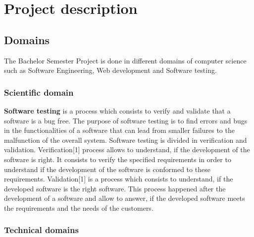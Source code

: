 \documentclass[conference,compsoc]{IEEEtran}
\begin{document}
\section{Project description}
\subsection{Domains}
The Bachelor Semester Project is done in different domains of computer science such as Software Engineering, Web development and Software testing. 

\subsubsection{Scientific domain}

\textbf{Software testing} is a process which consists to verify and validate that a software is a bug free. The purpose of software testing is to find errors and bugs in the functionalities of a software that can lead from smaller failures to the malfunction of the overall system. Software testing is divided in verification and validation.     
\newline                                                                                                                       
Verification[1] process allows to understand, if the development of the software is right. It consists to verify the specified requirements in order to understand if the development of the software is conformed to these requirements.      
\newline                                                                                                                     
Validation[1] is a process which consists to understand, if the developed software is the right software. This process happened after the development of a software and allow to answer, if the developed software meets the requirements and the needs of the customers. 
                                              
\subsubsection{Technical domains} 
\end{document}
